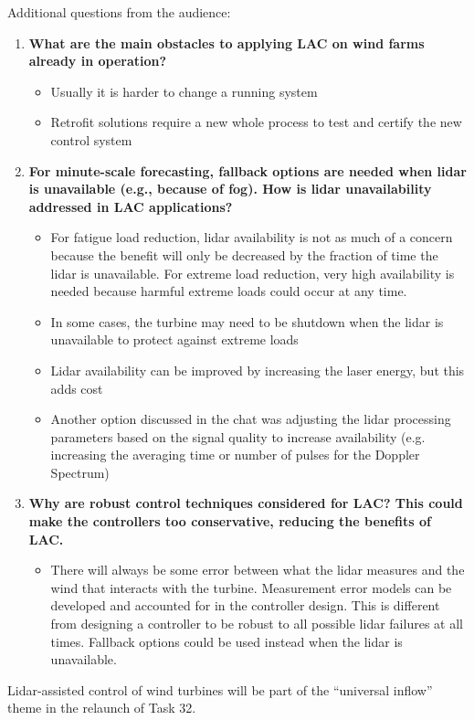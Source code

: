 Additional questions from the audience:
\begin{enumerate}
    \item \textbf{What are the main obstacles to applying LAC on wind farms already in operation?}
    \begin{itemize}
        \item Usually it is harder to change a running system
        \item Retrofit solutions require a new whole process to test and certify the new control system
    \end{itemize} 
    \item \textbf{For minute-scale forecasting, fallback options are needed when lidar is unavailable (e.g., because of fog). How is lidar unavailability addressed in LAC applications?}
    \begin{itemize}
        \item For fatigue load reduction, lidar availability is not as much of a concern because the benefit will only be decreased by the fraction of time the lidar is unavailable. For extreme load reduction, very high availability is needed because harmful extreme loads could occur at any time.
        \item In some cases, the turbine may need to be shutdown when the lidar is unavailable to protect against extreme loads
        \item Lidar availability can be improved by increasing the laser energy, but this adds cost
        \item Another option discussed in the chat was adjusting the lidar processing parameters based on the signal quality to increase availability (e.g. increasing the averaging time or number of pulses for the Doppler Spectrum)
    \end{itemize}
    \item \textbf{Why are robust control techniques considered for LAC? This could make the controllers too conservative, reducing the benefits of LAC.}
    \begin{itemize}
        \item There will always be some error between what the lidar measures and the wind that interacts with the turbine. Measurement error models can be developed and accounted for in the controller design. This is different from designing a controller to be robust to all possible lidar failures at all times. Fallback options could be used instead when the lidar is unavailable.
    \end{itemize}
\end{enumerate}

\begin{taskactions}
Lidar-assisted control of wind turbines will be part of the ``universal inflow'' theme in the relaunch of Task 32.
\end{taskactions}
